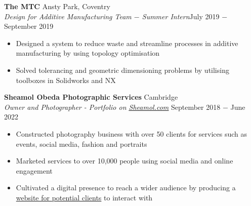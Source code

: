 \documentclass{article}
\begin{document}
\textbf{The MTC} \hfill Ansty Park, Coventry \\
\textit{Design for Additive Manufacturing Team $-$ Summer Intern}\hfill July 2019 $-$ September 2019
\begin{itemize}
    \item Designed a system to reduce waste and streamline processes in additive manufacturing by using topology optimisation
    \item Solved tolerancing and geometric dimensioning problems by utilising toolboxes in Solidworks and NX
\end{itemize} \medskip

\textbf{Sheamol Obeda Photographic Services} \hfill Cambridge\\
\textit{Owner and Photographer - Portfolio on \href{www.sheamol.com}{\underline{Sheamol.com}}} \hfill September 2018 $-$ June 2022
\begin{itemize}
    \item Constructed photography business with over 50 clients for services such as events, social media, fashion and portraits
    \item Marketed services to over 10,000 people using social media and online engagement
    \item Cultivated a digital presence to reach a wider audience by producing a \href{www.sheamol.com}{website for potential clients} to interact with 
\end{itemize} \medskip

\end{document}
